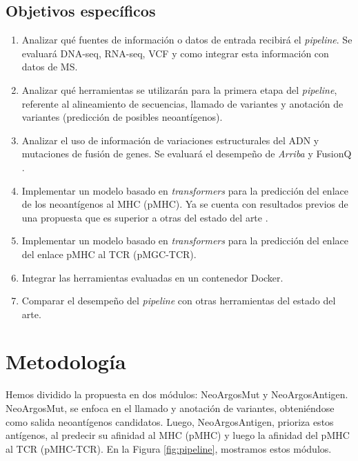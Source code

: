 \documentclass[a4paper,11pt]{article}
\begin{document}
	\subsection{Objetivos específicos}
	\begin{enumerate}
		\item Analizar qué fuentes de información o datos de entrada recibirá el \textit{pipeline}. Se evaluará DNA-seq, RNA-seq, VCF y como integrar esta información con datos de MS.
		
		\item Analizar qué herramientas se utilizarán para la primera etapa del \textit{pipeline}, referente al alineamiento de secuencias, llamado de variantes y  anotación de variantes (predicción de posibles neoantígenos). 
		
		\item Analizar el uso de información de variaciones estructurales del ADN y mutaciones de fusión de genes. Se evaluará el desempeño de \textit{Arriba} \citep{uhrig2021accurate} y FusionQ \citep{liu2013fusionq}.
		 
		\item Implementar un modelo basado en \textit{transformers} para la predicción del enlace de los neoantígenos al MHC (pMHC). Ya se cuenta con resultados previos de una propuesta que es superior a otras del estado del arte \citep{arceda2023neoantigen}.

        \item Implementar un modelo basado en \textit{transformers} para la predicción del enlace del enlace pMHC al TCR (pMGC-TCR). 
       
		\item Integrar las herramientas evaluadas en un contenedor Docker.
		\item Comparar el desempeño del \textit{pipeline} con otras herramientas del estado del arte.

		
	\end{enumerate}







\section{Metodología} 






Hemos dividido la propuesta en dos módulos: NeoArgosMut y NeoArgosAntigen. NeoArgosMut, se enfoca en el llamado y anotación de variantes, obteniéndose como salida neoantígenos candidatos. Luego, NeoArgosAntigen, prioriza estos antígenos, al predecir su afinidad al MHC (pMHC) y luego la afinidad del pMHC al TCR (pMHC-TCR). En la Figura \ref{fig:pipeline}, mostramos estos módulos. 
\end{document}
